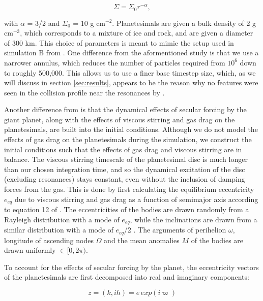 \begin{equation}\label{eq:surf_den}
	\Sigma = \Sigma_{0} r^{-\alpha},
\end{equation}

\noindent with $\alpha$ = 3/2 and $\Sigma_{0}$ = 10 g cm$^{-2}$. Planetesimals are given a bulk density of 2 g cm$^{-3}$, 
which corresponds to a mixture of ice and rock, and are given a diameter of 300 km. This choice of parameters is meant to 
mimic the setup used in simulation B from \cite{richardson00}. One difference from the aformentioned study is that we use a 
narrower annulus, which reduces the number of particles required from $10^6$ down to roughly 500,000. This allows us to use a 
finer base timestep size, which, as we will discuss in section \ref{sec:results}, appears to be the reason why no features were 
seen in the collision profile near the resonances by \cite{richardson00}.

Another difference from \cite{richardson00} is that the dynamical effects of secular forcing by the giant planet, along with the 
effects of viscous stirring and gas drag on the planetesimals, are built into the initial conditions. Although we do not model the 
effects of gas drag on the planetesimals during the simulation, we construct the initial conditions such that the effects of gas drag 
and viscous stirring are in balance. The viscous stirring timescale of the planetesimal disc is much longer than our chosen 
integration time, and so the dynamical excitation of the disc (excluding resonances) stays constant, even without the inclusion of 
damping forces from the gas. This is done by first calculating the equilibrium eccentricity $e_{eq}$ due to viscous stirring and 
gas drag as a function of semimajor axis according to equation 12 of \cite{kokubo02}. The eccentricities of the bodies are drawn 
randomly from a Rayleigh distribution with a mode of $e_{eq}$, while the inclinations are drawn from a similar distribution with a 
mode of $e_{eq}$/2 \cite{ida93a}. The arguments of perihelion $\omega$, longitude of ascending nodes $\Omega$ and the 
mean anomalies $M$ of the bodies are drawn uniformly $\in [0, 2 \pi)$.

To account for the effects of secular forcing by the planet, the eccentricity vectors of the planetesimals are first decomposed into 
real and imaginary components:

\begin{equation}\label{eq:kh}
	z = (k, ih) = e \, exp(i \varpi)
\end{equation}

